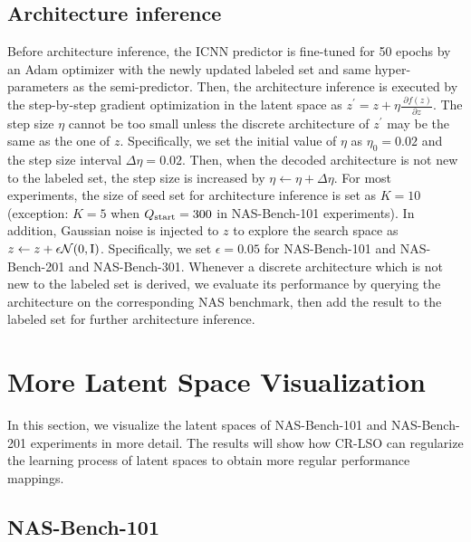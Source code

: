 \documentclass[10pt,twocolumn,letterpaper]{article}
\begin{document}
\subsection{Architecture inference} 
Before architecture inference, the ICNN predictor is fine-tuned for 50 epochs by an Adam optimizer with the newly updated labeled set and same hyper-parameters as the semi-predictor. Then, the architecture inference is executed by the step-by-step gradient optimization in the latent space as $z^{\prime} = z + \eta \frac{\ \partial f(z)}{\partial z}$. The step size $\eta$ cannot be too small unless the discrete architecture of $z^{\prime}$ may be the same as the one of $z$. Specifically, we set the initial value of $\eta$ as $\eta_{0}=0.02$ and the step size interval $\Delta\eta= 0.02$. Then, when the decoded architecture is not new to the labeled set, the step size is increased by $\eta \leftarrow \eta + \Delta \eta$. For most experiments, the size of seed set for architecture inference is set as $K=10$ (exception: $K=5$ when $Q_{\rm start} = 300$ in NAS-Bench-101 experiments). In addition, Gaussian noise is injected to $z$ to explore the search space as $z \leftarrow z + \epsilon \mathcal{N}(0,{\rm I})$. Specifically, we set $\epsilon=0.05$ for NAS-Bench-101 and NAS-Bench-201 and NAS-Bench-301. Whenever a discrete architecture which is not new to the labeled set is derived, we evaluate its performance by querying the architecture on the corresponding NAS benchmark, then add the result to the labeled set for further architecture inference.  

\section{More Latent Space Visualization}
In this section, we visualize the latent spaces of NAS-Bench-101 and NAS-Bench-201 experiments in more detail. The results will show how CR-LSO can regularize the learning process of latent spaces to obtain more regular performance mappings.
\subsection{NAS-Bench-101}
\end{document}
